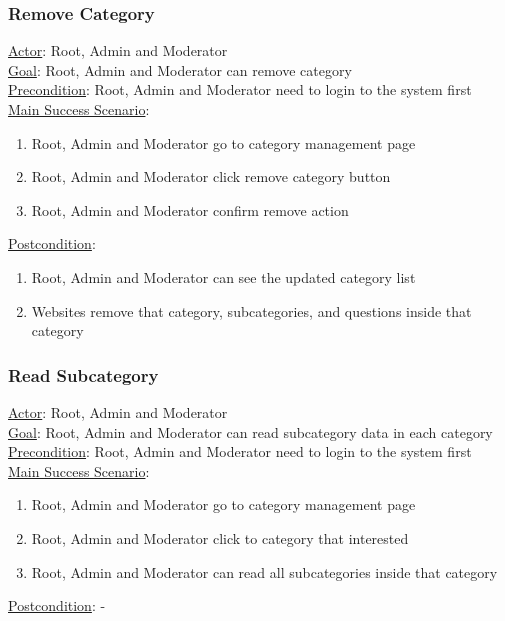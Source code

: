 \documentclass[12pt,oneside,openright,a4paper]{cpe-english-project}
\begin{document}
	\subsubsection{Remove Category}
	\underline{Actor}: Root, Admin and Moderator\\
	\underline{Goal}: Root, Admin and Moderator can remove category\\
	\underline{Precondition}: Root, Admin and Moderator need to login to the system first\\
	\underline{Main Success Scenario}:
	\begin{enumerate}[label={\arabic*.}]
		\item Root, Admin and Moderator go to category management page
		\item Root, Admin and Moderator click remove category button
		\item Root, Admin and Moderator confirm remove action
	\end{enumerate}
	\underline{Postcondition}: 
	\begin{enumerate}[label={\arabic*.}]
		\item Root, Admin and Moderator can see the updated category list
		\item Websites remove that category, subcategories, and questions inside that category
	\end{enumerate}

	\subsubsection{Read Subcategory}
	\underline{Actor}: Root, Admin and Moderator\\
	\underline{Goal}: Root, Admin and Moderator can read subcategory data in each category\\
	\underline{Precondition}: Root, Admin and Moderator need to login to the system first\\
	\underline{Main Success Scenario}:
	\begin{enumerate}[label={\arabic*.}]
		\item Root, Admin and Moderator go to category management page
		\item Root, Admin and Moderator click to category that interested
		\item Root, Admin and Moderator can read all subcategories inside that category
	\end{enumerate}
	\underline{Postcondition}: -
\end{document}
